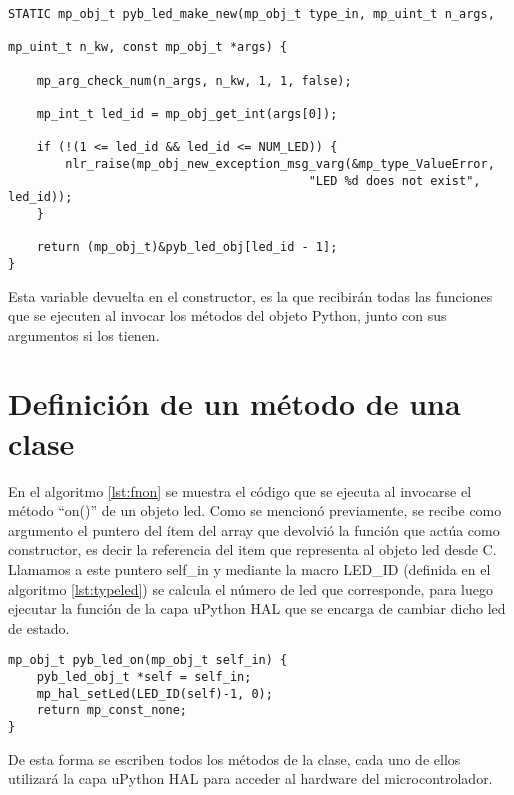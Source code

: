 \begin{lstlisting}[label={lst:constructor},caption=Definición de la función constructor.] 
STATIC mp_obj_t pyb_led_make_new(mp_obj_t type_in, mp_uint_t n_args, 
																 mp_uint_t n_kw, const mp_obj_t *args) {
																
    mp_arg_check_num(n_args, n_kw, 1, 1, false);
		
    mp_int_t led_id = mp_obj_get_int(args[0]);
		
    if (!(1 <= led_id && led_id <= NUM_LED)) {
        nlr_raise(mp_obj_new_exception_msg_varg(&mp_type_ValueError,
				                          "LED %d does not exist", led_id));
    }
		
    return (mp_obj_t)&pyb_led_obj[led_id - 1];
}
\end{lstlisting}

Esta variable devuelta en el constructor, es la que recibirán todas las funciones que se ejecuten al invocar los métodos del objeto Python, junto con sus argumentos si los tienen.

\section{Definición de un método de una clase}

En el algoritmo \ref{lst:fnon} se muestra el código que se ejecuta al invocarse el método “on()” de un objeto led. Como se mencionó previamente, se recibe como argumento el puntero del ítem del array que devolvió la función que actúa como constructor, es decir la referencia del item que representa al objeto led desde C. Llamamos a este puntero self\_in y mediante la macro LED\_ID (definida en el algoritmo \ref{lst:typeled}) se calcula el número de led que corresponde, para luego ejecutar la función de la capa uPython HAL que se encarga de cambiar dicho led de estado.

\begin{lstlisting}[label={lst:fnon},caption=Definición de la función que se ejecuta al invocar el método on().] 
mp_obj_t pyb_led_on(mp_obj_t self_in) {
    pyb_led_obj_t *self = self_in;
    mp_hal_setLed(LED_ID(self)-1, 0);
    return mp_const_none;
}
\end{lstlisting}

De esta forma se escriben todos los métodos de la clase, cada uno de ellos utilizará la capa uPython HAL para acceder al hardware del microcontrolador.




